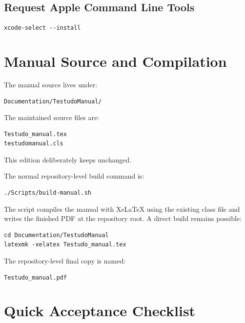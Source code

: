 \documentclass{testudomanual}
\begin{document}
\section{Request Apple Command Line Tools}
\begin{lstlisting}
xcode-select --install
\end{lstlisting}

\chapter{Manual Source and Compilation}

The manual source lives under:
\begin{lstlisting}
Documentation/TestudoManual/
\end{lstlisting}

The maintained source files are:
\begin{lstlisting}
Testudo_manual.tex
testudomanual.cls
\end{lstlisting}

This edition deliberately keeps  unchanged.

The normal repository-level build command is:
\begin{lstlisting}
./Scripts/build-manual.sh
\end{lstlisting}

The script compiles the manual with XeLaTeX using the existing class file and writes the finished PDF at the repository root. A direct build remains possible:
\begin{lstlisting}
cd Documentation/TestudoManual
latexmk -xelatex Testudo_manual.tex
\end{lstlisting}

The repository-level final copy is named:
\begin{lstlisting}
Testudo_manual.pdf
\end{lstlisting}

\chapter{Quick Acceptance Checklist}
\end{document}
